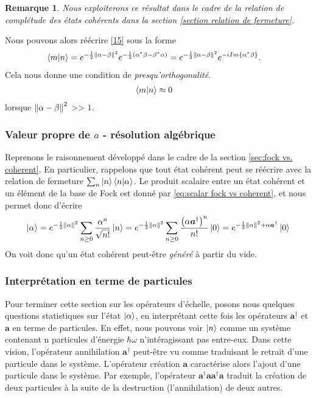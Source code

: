 \documentclass[11pt,oneside,a4paper]{article}
\newcommand{\h}{\ensuremath{\hbar}}
\newtheorem{remark}[theorem]{Remarque}
\begin{document}
\begin{remark}
  Nous exploiterons ce résultat dans le cadre de la relation de complétude des états cohérents dans la section \ref{section relation de fermeture}.
\end{remark}

Nous pouvons alors réécrire \eqref{15} sous la forme
\begin{align*}
  \braket{m}{n} &= e^{-\frac{1}{2}\norm{\alpha-\beta}^2}e^{-\frac{1}{2}\left(\alpha^*\beta-\beta^*\alpha\right)} = e^{-\frac{1}{2}\norm{\alpha-\beta}^2}e^{-iIm\left\{\alpha^*\beta\right\}}.
\end{align*}
Cela nous donne une condition de \emph{presqu'orthogonalité}.
\begin{align*}
  \braket{m}{n} &\approx 0
\end{align*}
lorsque $\norm{\alpha-\beta}^2$ >> $1$.

\subsubsection{Valeur propre de $a$ - résolution algébrique}\label{sec:vp algebrique}
Reprenons le raisonnement développé dans le cadre de la section \ref{sec:fock vs. coherent}. En particulier, rappelons que tout état cohérent peut se réécrire avec la relation de fermeture $\sum_n \ket{n}\braket{n}{\alpha}$. Le produit scalaire entre un état cohérent et un élément de la base de Fock est donné par \eqref{eq:scalar fock vs coherent}, et nous permet donc d'écrire
\begin{align}
  \ket{\alpha} = e^{-\frac{1}{2}\norm{\alpha}^2}\sum_{n\geq 0}\frac{\alpha^n}{\sqrt{n!}}\ket{n} = e^{-\frac{1}{2}\norm{\alpha}^2}\sum_{n\geq 0}\frac{\left(\alpha\bm{a}^\dagger\right)^n}{n!}\ket{0} = e^{-\frac{1}{2}\norm{\alpha}^2+\alpha\bm{a}^\dagger}\ket{0}\label{eq:vp algebrique}
\end{align}
On voit donc qu'un état cohérent peut-être \textit{généré} à partir du vide. 
\subsubsection{Interprétation en terme de particules}

Pour terminer cette section sur les opérateurs d'échelle, posons nous quelques questions statistiques sur l'état $\ket{\alpha}$, en interprétant cette fois les opérateurs $\bm{a}^\dagger$ et $\bm{a}$ en terme de particules. En effet, nous pouvons voir $\ket{n}$ comme un système contenant n particules d'énergie $\h\omega$ n'intéragissant pas entre-eux. Dans cette vision, l'opérateur annihilation $\bm{a}^\dagger$ peut-être vu comme traduisant le retrait d'une particule dans le système. L'opérateur création $\bm{a}$ caractérise alors l'ajout d'une particule dans le système. Par exemple, l'opérateur $\bm{a}^\dagger\bm{a}\bm{a}^\dagger\bm{a}$ traduit la création de deux particules à la suite de la destruction (l'annihilation) de deux autres.\\
\end{document}
